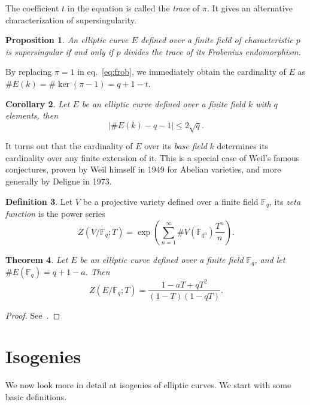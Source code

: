 \documentclass[10pt]{article}
\theoremstyle{plain}
\newtheorem{theorem}{Theorem}
\newtheorem{corollary}[theorem]{Corollary}
\newtheorem{proposition}[theorem]{Proposition}
\theoremstyle{definition}
\newtheorem{definition}[theorem]{Definition}
\def\F{\ensuremath{\mathbb{F}}}
\begin{document}
The coefficient $t$ in the equation is called the \emph{trace} of
$π$. %
It gives an alternative characterization of supersingularity.

\begin{proposition}
  An elliptic curve $E$ defined over a finite field of characteristic
  $p$ is supersingular if and only if $p$ divides the trace of its
  Frobenius endomorphism.
\end{proposition}

By replacing $π=1$ in eq.~\eqref{eq:frob}, we immediately obtain the
cardinality of $E$ as $\#E(k) = \#\ker(π-1) = q+1-t$. %

\begin{corollary}
  Let $E$ be an elliptic curve defined over a finite field $k$ with $q$
  elements, then
  \[|\#E(k) - q - 1| ≤ 2\sqrt{q}.\]
\end{corollary}

It turns out that the cardinality of $E$ over its \emph{base field}
$k$ determines its cardinality over any finite extension of it. %
This is a special case of Weil's famous conjectures, proven by Weil
himself in 1949 for Abelian varieties, and more generally by Deligne
in 1973.

\begin{definition}
  Let $V$ be a projective variety defined over a finite field $\F_q$,
  its \emph{zeta function} is the power series
  \[Z(V/\F_q; T) = \exp\left(\sum_{n=1}^∞\#V(\F_{q^n})\frac{T^n}{n}\right).\]
\end{definition}

\begin{theorem}
  \label{th:weil}
  Let $E$ be an elliptic curve defined over a finite field
  $\F_q$, and let $\#E(\F_q)=q+1-a$. Then
  \[Z(E/\F_q;T) = \frac{1-aT+qT^2}{(1-T)(1-qT)}.\]
\end{theorem}
\begin{proof}
  See~\cite[V, Th.~2.4]{silverman:elliptic}.
\end{proof}



\section{Isogenies}
\label{sec:isogenies}

We now look more in detail at isogenies of elliptic curves. %
We start with some basic definitions.
\end{document}
